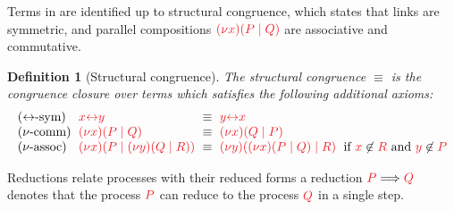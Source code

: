 \documentclass[submission,copyright,creativecommons]{eptcs}
\newtheorem{definition}[lemma]{Definition}
\begin{document}
Terms in \cp are identified up to structural congruence, which states that links are symmetric, and parallel compositions $\tm{\cpCut{x}{P}{Q}}$ are associative and commutative.
\begin{definition}[Structural congruence]\label{def:cp-equiv}
  The structural congruence $\equiv$ is the congruence closure over terms which
  satisfies the following additional axioms:
  \[
    \setlength{\arraycolsep}{3pt}
    \begin{array}{llcll}
      \cpEquivLinkComm
      & \tm{\cpLink{x}{y}}
      & \equiv
      & \tm{\cpLink{y}{x}}
      \\
      \cpEquivCutComm
      & \tm{\cpCut{x}{P}{Q}}
      & \equiv
      & \tm{\cpCut{x}{Q}{P}}
      \\
      \cpEquivCutAss1
      & \tm{\cpCut{x}{P}{\cpCut{y}{Q}{R}}}
      & \equiv
      & \tm{\cpCut{y}{\cpCut{x}{P}{Q}}{R}}
      & \text{if }\notFreeIn{x}{R}\text{ and }\notFreeIn{y}{P}
    \end{array}
  \]
\end{definition}\noindent
Reductions relate processes with their reduced forms \eg a reduction $\reducesto{P}{Q}$ denotes that the process $\tm{P}$ can reduce to the process $\tm{Q}$ in a single step.
\end{document}
